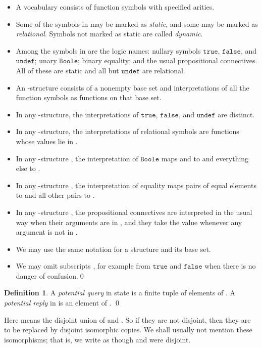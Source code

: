 \documentclass{LMCS}
\theoremstyle{definition}
\newtheorem{df}[thm]{Definition}
\newenvironment{ls}{\begin{itemize}}{\end{itemize}}
\newcommand{\ttt}[1]{\ensuremath{\mathtt {#1}}}
\begin{document}
\begin{conv}   \label{vocab}
\mbox{}
  \begin{ls}
    \item A vocabulary  consists of function symbols with
    specified arities.
    \item Some of the symbols in  may be marked as
    \emph{static}, and some may be marked as \emph{relational}.
    Symbols not marked as static are called \emph{dynamic}.
    \item Among the symbols in  are the logic names: nullary
    symbols \ttt{true}, \ttt{false}, and \ttt{undef}; unary
    \ttt{Boole}; binary equality; and the usual propositional
    connectives.  All of these are static and all but \ttt{undef} are
    relational.
  \item An -structure consists of a nonempty base set and
    interpretations of all the function symbols as functions on that
    base set.
  \item In any -structure, the interpretations of \ttt{true},
    \ttt{false}, and \ttt{undef} are distinct.
    \item In any -structure, the interpretations of relational
    symbols are functions whose values lie in 
    .
  \item In any -structure , the interpretation of
    \ttt{Boole} maps  and  to
     and everything else to .
    \item In any -structure , the interpretation of
    equality maps pairs of equal elements to  and all
    other pairs to .
    \item In any -structure , the propositional connectives
    are interpreted in the usual way when their arguments are in
    , and they take the value
     whenever any argument is not in
    .
    \item We may use the same notation  for a structure and its
    base set.
\item We may omit subscripts , for example from \ttt{true} and
  \ttt{false} when there is no danger of confusion.\qed
  \end{ls}
\end{conv}



\begin{df}
A \emph{potential query} in state  is a finite tuple of elements of
.  A \emph{potential reply} in  is an element of
.
\qed\end{df}

Here  means the disjoint union of  and .
So if they are not disjoint, then they are to be replaced by disjoint
isomorphic copies.  We shall usually not mention these isomorphisms;
that is, we write as though  and  were disjoint.
\end{document}
